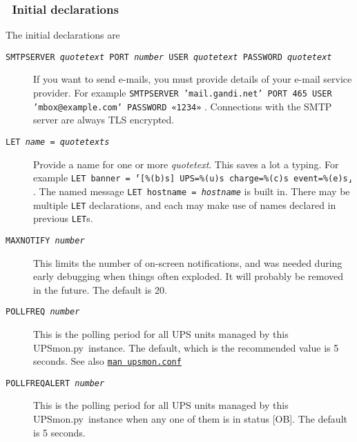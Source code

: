 \documentclass[12pt]{article}
\newlength{\headersep}\setlength{\headersep}{3mm}
\newcommand{\Hsep}{\hspace{\headersep}}
\newcommand{\UPSmon}{\mbox{\textcolor{UPSMONCOLOUR}{UPSmon.py}}}
\newcommand{\status}[1]{\textcolor{UPSDCOLOUR}{[{#1}]}}
\newcommand{\NUTman}[1]{\href{http://networkupstools.org/docs/man/#1.html}{\texttt{man #1}}}
\begin{document}
\subsubsection{\Hsep\ Initial declarations}\label{section:initdecl}

The initial declarations are 

\begin{description}

\item[\texttt{SMTPSERVER \textit{quotetext} PORT \textit{number} USER
    \textit{quotetext} PASSWORD \textit{quotetext}}] \hspace{7mm} If you want
  to send e-mails, you must provide details of your e-mail service provider.
  For example \texttt{SMTPSERVER 'mail.gandi.net' PORT 465 USER
    'mbox@example.com' PASSWORD «1234»} . Connections with the SMTP server
  are always TLS encrypted.

\item[\texttt{LET \textit{name} = \textit{quotetexts}}] \hspace{7mm} Provide a
  name for one or more \textit{quotetext}.  This saves a lot a typing.  For
  example \texttt{LET banner = ⸢[\%(b)s] UPS=\%(u)s charge=\%(c)s
    event=\%(e)s⸥} .  The named message \texttt{LET hostname =
    \textit{hostname}} is built in.  There may be multiple \texttt{LET}
  declarations, and each may make use of names declared in previous
  \texttt{LET}s.

\item[\texttt{MAXNOTIFY \textit{number}}] \hspace{7mm} This limits the number
  of on-screen notifications, and was needed during early debugging when
  things often exploded.  It will probably be removed in the future.  The
  default is 20.

\item[\texttt{POLLFREQ \textit{number}}] \hspace{7mm} This is the polling
  period for all UPS units managed by this \UPSmon\ instance.  The default,
  which is the recommended value is 5 seconds.  See also \NUTman{upsmon.conf}

\item[\texttt{POLLFREQALERT \textit{number}}] \hspace{3mm} This is the polling
  period for all UPS units managed by this \UPSmon\ instance when any one of
  them is in status \status{OB}.  The default is 5 seconds.

\end{description}
\end{document}
